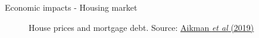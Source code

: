 \begin{frame}{Economic impacts - Housing market}

\begin{figure}
\begin{center}


\caption{House prices and mortgage debt. Source: \href{https://pubs.aeaweb.org/doi/pdfplus/10.1257/jep.33.1.107}{Aikman \emph{et al} (2019)}}

\end{center}
\end{figure}

\end{frame}



